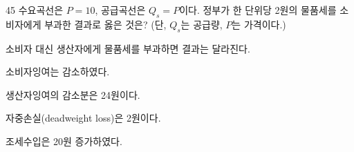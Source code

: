 \begin{question}{45}
수요곡선은 $P=10$, 공급곡선은 $Q_s=P$이다. 정부가 한 단위당 2원의 물품세를 소비자에게 부과한 결과로 옳은 것은? (단, $Q_s$는 공급량, $P$는 가격이다.)
\begin{choices}
  \item 소비자 대신 생산자에게 물품세를 부과하면 결과는 달라진다.
  \item 소비자잉여는 감소하였다.
  \item 생산자잉여의 감소분은 24원이다.
  \item 자중손실(deadweight loss)은 2원이다.
  \item 조세수입은 20원 증가하였다.
\end{choices}
\end{question}
